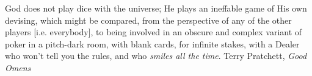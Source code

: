 
\begin{declaration}
  
\end{declaration}

\begin{abstract}
  
\end{abstract}

\begin{acknowledgements}
  
\end{acknowledgements}

\begin{preface}
  
\end{preface}

\tableofcontents


\frontquote%
{God does not play dice with the universe; He plays an ineffable game of His own
devising, which might be compared, from the perspective of any of the other
players [i.e. everybody], to being involved in an obscure and complex variant of
poker in a pitch-dark room, with blank cards, for infinite stakes, with a Dealer
who won't tell you the rules, and who \emph{smiles all the time}.}
{Terry Pratchett, \emph{Good Omens}}
